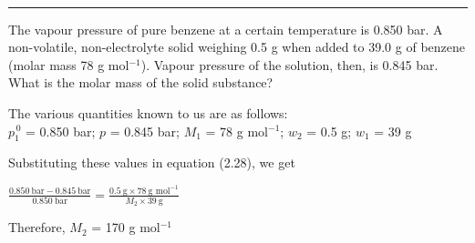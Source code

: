 \documentclass[11pt,a4paper]{article}
\begin{document}
\vspace{10pt}
\begin{tcolorbox}[enhanced,colback=white,colframe=gray!40,boxrule=0.8pt,arc=2mm,left=24pt,right=8pt,top=4pt,bottom=6pt,boxsep=0pt,drop fuzzy shadow=gray!40,overlay={\fill[SkyBlue] (frame.south west) rectangle ([xshift=14pt]frame.north west);}]
\noindent\begin{minipage}[t]{0.17\linewidth}
\\[-3pt]
{\color{DeepSkyBlue3}\rule{\linewidth}{0.8pt}}
\end{minipage}\hfill
\begin{minipage}[t]{0.81\linewidth}
The vapour pressure of pure benzene at a certain temperature is 0.850 bar. A non-volatile, non-electrolyte solid weighing 0.5 g when added to 39.0 g of benzene (molar mass 78 g mol$^{-1}$). Vapour pressure of the solution, then, is 0.845 bar. What is the molar mass of the solid substance?
\end{minipage}

\vspace{8pt}
\noindent\begin{minipage}[t]{0.17\linewidth}
\end{minipage}\hfill
\begin{minipage}[t]{0.81\linewidth}
The various quantities known to us are as follows:\\
$p_1^{\,0}$ = 0.850 bar;\; $p$ = 0.845 bar;\; $M_1$ = 78 g mol$^{-1}$;\; $w_2$ = 0.5 g;\; $w_1$ = 39 g

Substituting these values in equation (2.28), we get

\noindent$\displaystyle \frac{0.850\ \text{bar} - 0.845\ \text{bar}}{0.850\ \text{bar}} = \frac{0.5\ \text{g} \times 78\ \text{g mol}^{-1}}{M_2 \times 39\ \text{g}}$

Therefore, $M_2$ = 170 g mol$^{-1}$
\end{minipage}
\end{tcolorbox}
\end{document}
